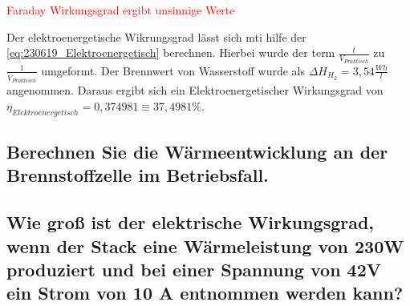 \textcolor{red}{\Huge Faraday Wirkungsgrad ergibt unsinnige Werte}

Der elektroenergetische Wikrungsgrad lässt sich mti hilfe der \autoref{eq:230619_Elektroenergetisch} berechnen.
Hierbei wurde der term $\frac{t}{V_{Praktisch}}$ zu $\frac{1}{\dot{V}_{Praktisch}}$ umgeformt.
Der Brennwert von Wasserstoff wurde als $\Delta H_{H_2} = 3,54\frac{Wh}{l}$ \cite{dH-H2} angenommen.
Daraus ergibt sich ein Elektroenergetischer Wirkungsgrad von $\eta_{Elektroenergetisch} = 0,374981 \equiv 37,4981 \%$.

\subsection{Berechnen Sie die Wärmeentwicklung an der Brennstoffzelle im Betriebsfall.}



\subsection{Wie groß ist der elektrische Wirkungsgrad, wenn der Stack eine Wärmeleistung von
230W produziert und bei einer Spannung von 42V ein Strom von 10 A entnommen werden kann?}
